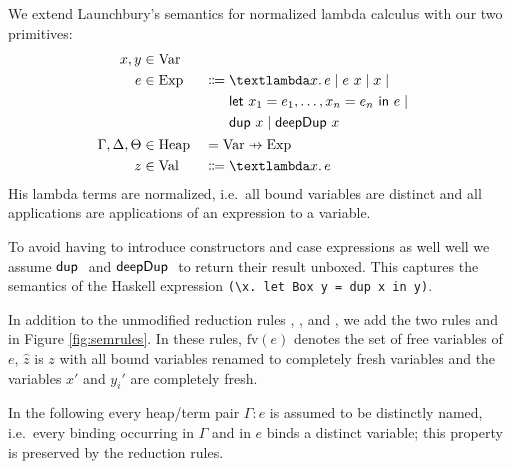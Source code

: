 \documentclass[preprint]{sigplanconf}
\newcommand\pfun{\mathrel{\ooalign{\hfil$\mapstochar\mkern5mu$\hfil\cr$\to$\cr}}}
\theoremstyle{nonumberplain}
\newcommand{\li}{\lstinline[style=Haskell]}
\begin{document}
We extend Launchbury’s semantics for normalized lambda calculus with our two primitives:
\newcommand{\mdup}{\text{\textsf{dup}}}
\newcommand{\mdeepDup}{\text{\textsf{deepDup}}}
\newcommand{\sVar}{\text{Var}}
\newcommand{\sExp}{\text{Exp}}
\newcommand{\sHeap}{\text{Heap}}
\newcommand{\sVal}{\text{Val}}
\newcommand{\sValue}{\text{Value}}
\newcommand{\sEnv}{\text{Env}}
\newcommand{\sApp}[2]{#1\ #2}
\newcommand{\sLam}[2]{\text{\textlambda} #1.\, #2}
\newcommand{\sDup}[1]{\sApp \mdup #1}
\newcommand{\sDeepDup}[1]{\sApp \mdeepDup #1}
\newcommand{\sLet}[2]{\text{\textsf{let}}\ #1\ \text{\textsf{in}}\ #2}
\newcommand{\sred}[4]{#1 : #2 \Downarrow #3 : #4}
\newcommand{\sRule}[1]{\text{{\textsc{#1}}}}
\newcommand{\fv}[1]{\text{fv}(#1)}
\newcommand{\ufv}[1]{\text{ufv}(#1)}
\newcommand{\ur}[2]{\text{ur}_{#1}(#2)}
\newcommand{\dom}[1]{\text{dom}\,#1}
\newcommand{\fresh}[1]{#1'}
\begin{alignat*}{2}
x,y &\in \sVar \\
e &\in
\sExp &&\Coloneqq
\begin{aligned}[t]&
\sLam x e
\mid \sApp e x
\mid x \mid
\\&
\sLet {x_1 = e_1,\ldots,x_n = e_n} e \mid
\\&
\sDup x \mid \sDeepDup x
\end{aligned}\\
\Gamma, \Delta, \Theta &\in \sHeap &&= \sVar \pfun \sExp \\
z &\in \sVal &&\Coloneqq \sLam x e
\end{alignat*}
His lambda terms are normalized, i.e.\ all bound variables are distinct and all applications are applications of an expression to a variable.

To avoid having to introduce constructors and case expressions as well well we assume $\sDup$ and $\sDeepDup$ to return their result unboxed. This captures the semantics of the Haskell expression \li!(\x. let Box y = dup x in y)!.

In addition to the unmodified reduction rules \sRule{Lam}, \sRule{App}, \sRule{Var} and \sRule{Let}, we add the two rules \sRule{Dup} and \sRule{Deep} in Figure \ref{fig:semrules}. In these rules, $\fv e$ denotes the set of free variables of $e$, $\hat z$ is $z$ with all bound variables renamed to completely fresh variables and the variables $x'$ and $y_i'$ are completely fresh.

In the following every heap/term pair $\Gamma : e$ is assumed to be distinctly named, i.e.\ every binding occurring in $\Gamma$ and in $e$ binds a distinct variable; this property is preserved by the reduction rules.
\end{document}
